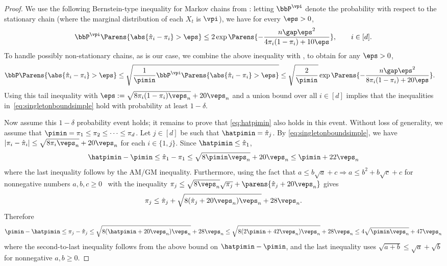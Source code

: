 \begin{proof}
  We use the following Bernstein-type inequality for Markov chains
  from \citet[][Theorem~3.8]{paulin15}: letting $\bbP^{\vpi}$ denote
  the probability with respect to the stationary chain (where the
  marginal distribution of each $X_t$ is $\vpi$), we have for every
  $\eps>0$,
  \[
    \bbP^{\vpi}
    \Parens{
      \abs{ \hat\pi_i-\pi_i} > \eps
    } \le
    2\exp\Parens{
      -\frac{
        n\gap\eps^2
      }{
        4\pi_i(1-\pi_i)+10\eps
      }
    },
    \qquad i\in[d]
    .
  \]
  To handle possibly non-stationary chains, as is our case, we combine
  the above inequality with \citet[][Proposition 3.14]{paulin15}, to
  obtain for any $\eps>0$,
  \begin{align*}
    \bbP
    \Parens{
      \abs{ \hat\pi_i-\pi_i} > \eps
    }
    &\le
    \sqrt{
      \frac1\pimin
      \bbP^{\vpi}
      \Parens{
        \abs{ \hat\pi_i-\pi_i} > \eps
      }
    } 
    \le
    \sqrt{\frac2\pimin}
    \exp\Parens{
      -\frac{
        n\gap\eps^2
      }{
        8\pi_i(1-\pi_i)+20\eps
      }
    }.
  \end{align*}
  Using this tail inequality with $\eps :=
  \sqrt{8\pi_i(1-\pi_i)\veps_n} + 20\veps_n$ and a union bound over
  all $i \in [d]$ implies that the inequalities
  in~\cref{eq:singletonboundsimple} hold with probability at least
  $1-\delta$.

  Now assume this $1-\delta$ probability event holds; it remains to
  prove that \cref{eq:hatpimin} also holds in this event.
  Without loss of generality, we assume that $\pimin = \pi_1 \leq
  \pi_2 \leq \dotsb \leq \pi_d$.
  Let $j \in [d]$ be such that $\hatpimin = \hat\pi_j$.
  By \cref{eq:singletonboundsimple}, we have $|\pi_i - \hat\pi_i| \leq
  \sqrt{8\pi_i\veps_n} + 20\veps_n$ for each $i \in \{1,j\}$.
  Since $\hatpimin \leq \hat\pi_1$,
  \[
    \hatpimin - \pimin
    \leq \hat\pi_1 - \pi_1
    \leq \sqrt{8\pimin\veps_n} + 20\veps_n
    \leq \pimin + 22\veps_n
  \]
  where the last inequality follows by the AM/GM inequality.
  Furthermore, using the fact that $a \leq b\sqrt{a} + c \Rightarrow a
  \leq b^2 + b\sqrt{c} + c$ for nonnegative numbers $a, b, c \geq
  0$~\citep[see, e.g.,][]{BBL04} with the inequality $\pi_j \leq
  \sqrt{8\veps_n} \sqrt{\pi_j} + \parens{\hat\pi_j + 20\veps_n}$ gives
  \[
    \pi_j
    \leq 
    \hat\pi_j
    + \sqrt{8(\hat\pi_j + 20\veps_n)\veps_n}
    + 28\veps_n
    .
  \]
  Therefore
  \[
    \pimin - \hatpimin
    \leq \pi_j - \hat\pi_j
    \leq \sqrt{8(\hatpimin + 20\veps_n)\veps_n} + 28\veps_n
    \leq \sqrt{8(2\pimin + 42\veps_n)\veps_n} + 28\veps_n
    \leq 4\sqrt{\pimin\veps_n} + 47\veps_n
  \]
  where the second-to-last inequality follows from the above bound on
  $\hatpimin - \pimin$, and the last inequality uses $\sqrt{a+b} \leq
  \sqrt{a} + \sqrt{b}$ for nonnegative $a,b \geq 0$.
\end{proof}

